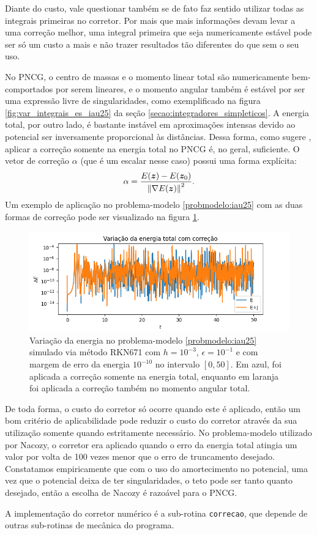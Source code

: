 Diante do custo, vale questionar também se de fato faz sentido utilizar todas as integrais primeiras no corretor. Por mais que mais informações devam levar a uma correção melhor, uma integral primeira que seja numericamente estável pode ser só um custo a mais e não trazer resultados tão diferentes do que sem o seu uso. 

No PNCG, o centro de massas e o momento linear total são numericamente bem-comportados por serem lineares, e o momento angular também é estável por ser uma expressão livre de singularidades, como exemplificado na figura \ref{fig:var_integrais_es_iau25} da seção \ref{secao:integradores_simpleticos}. A energia total, por outro lado, é bastante instável em aproximações intensas devido ao potencial ser inversamente proporcional às distâncias. Dessa forma, como sugere \cite{Nacozy1972}, aplicar a correção somente na energia total no PNCG é, no geral, suficiente. O vetor de correção $\alpha$ (que é um escalar nesse caso) possui uma forma explícita:
\begin{equation}
    \alpha = \dfrac{E(\bm z) - E(\bm z_0)}{\left\Vert \nabla E(\bm z) \right\Vert^2}.
\end{equation}
Um exemplo de aplicação no problema-modelo \ref{probmodelo:iau25} com as duas formas de correção pode ser visualizado na figura \ref{fig:var_energia_iau25_corretores}.

\begin{figure}
    \centering
    \includegraphics[width=\linewidth]{tcc/img/var_energia_todas_vs_energia_iau25.png}
    \caption{Variação da energia no problema-modelo \ref{probmodelo:iau25} simulado via método RKN671 com $h=10^{-3}$, $\epsilon = 10^{-1}$ e com margem de erro da energia $10^{-10}$ no intervalo $[0,50]$. Em azul, foi aplicada a correção somente na energia total, enquanto em laranja foi aplicada a correção também no momento angular total.}
    \label{fig:var_energia_iau25_corretores}
\end{figure}

De toda forma, o custo do corretor só ocorre quando este é aplicado, então um bom critério de aplicabilidade pode reduzir o custo do corretor através da sua utilização somente quando estritamente necessário. No problema-modelo utilizado por Nacozy, o corretor era aplicado quando o erro da energia total atingia um valor por volta de 100 vezes menor que o erro de truncamento desejado. Constatamos empiricamente que com o uso do amortecimento no potencial, uma vez que o potencial deixa de ter singularidades, o teto pode ser tanto quanto desejado, então a escolha de Nacozy é razoável para o PNCG.

A implementação do corretor numérico é a sub-rotina \verb|correcao|, que depende de outras sub-rotinas de mecânica do programa.